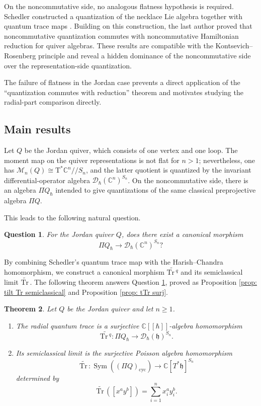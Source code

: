 \documentclass[11pt,reqno]{amsart}
\newtheorem{theorem}{Theorem}[section]
\newtheorem{question}[theorem]{Question}
\theoremstyle{definition}
\newcommand{\bbC}{\mathbb{C}}
\newcommand{\Tr}{\mathrm{Tr} \,}
\newcommand{\mD}{\mathcal{D}}
\newcommand{\cyc}{\mathrm{cyc}}
\newcommand{\Sym}{\operatorname{Sym}}
\newcommand{\fkh}{\mathfrak{h}}
\newcommand{\rmT}{\mathrm{T}}
\newcommand{\mM}{\mathcal{M}}
\newcommand{\tTr}{\widetilde{\Tr}}
\begin{document}
 On the noncommutative side, no analogous flatness hypothesis is required. Schedler constructed a quantization of the necklace Lie algebra together with quantum trace maps \cite{Sch2005,GinSch2006}. Building on this construction, the last author proved that noncommutative quantization commutes with noncommutative Hamiltonian reduction for quiver algebras\cite{Zhao2021Com,Zhao2023Non}. 
These results are compatible with the Kontsevich--Rosenberg principle and 
reveal a hidden dominance of the noncommutative side over the representation-side quantization.



The failure of flatness in the Jordan case prevents a direct application of the ``quantization commutes with reduction'' theorem and motivates studying the radial-part comparison directly.

\subsection{Main results}

Let $Q$ be the Jordan
quiver, which consists
of one vertex and one
loop. The moment map
on the quiver
representations is
not flat for \(n>1\); nevertheless,
one has \(\mM_n (Q) \cong \rmT^\ast \bbC^n // S_{n}\), and the latter quotient is quantized by the invariant differential-operator algebra \(\mD_\hbar (\bbC^n)^{S_n}\).
On the noncommutative side, there is an algebra \(\Pi Q_{\hbar}\) intended to give quantizations of the
same classical preprojective algebra \(\Pi Q\).


This leads to the following natural question.

\begin{question}\label{que: [q, r] = 0}
For the Jordan quiver \(Q\), does there
exist a canonical morphism
\[
\Pi Q_{\hbar}\longrightarrow \mD_\hbar(\bbC^n)^{S_n}?
\]
\end{question}




By combining Schedler's quantum trace map with the Harish--Chandra homomorphism, we construct a canonical morphism \(\widetilde{\Tr^q}\) and its semiclassical limit \(\tTr\). The following theorem answers Question \ref{que: [q, r] = 0}, proved as Proposition \ref{prop: tilt Tr semiclassical} and Proposition \ref{prop: tTr surj}.

\begin{theorem}
\label{thm: intro qtrace suj}
Let \(Q\) be the Jordan quiver and let \(n\geq1\).
\begin{enumerate}
\item[$(1)$]
The radial quantum trace is a surjective
\(\bbC[[\hbar]]\)-algebra homomorphism
\[
\widetilde{\Tr^q}:
\Pi Q_{\hbar}
\longrightarrow
\mD_\hbar(\fkh)^{S_n}.
\]

\item[$(2)$]
Its semiclassical limit is the surjective Poisson algebra homomorphism
\[
\widetilde{\Tr}:
\Sym((\Pi Q)_\cyc)
\longrightarrow
\bbC[T^*\fkh]^{S_n}
\]
determined by
\[
\widetilde{\Tr}([x^a y^b])
=
\sum_{i=1}^n x_i^a y_i^b.
\]
\end{enumerate}
\end{theorem}
\end{document}
